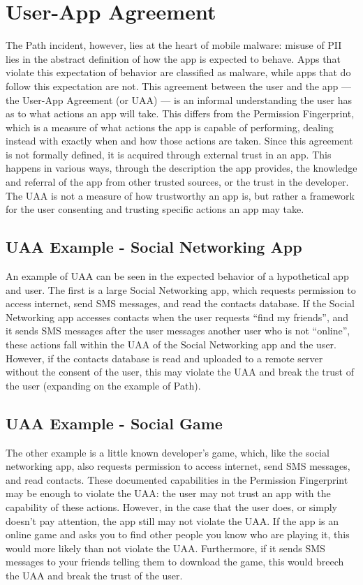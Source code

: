 \section{User-App Agreement}
The Path incident, however, lies at the heart of mobile malware: misuse of PII lies in the abstract definition of how the app is expected to behave. Apps that violate this expectation of behavior are classified as malware, while apps that do follow this expectation are not. This agreement between the user and the app --- the User-App Agreement (or UAA) --- is an informal understanding the user has as to what actions an app will take. This differs from the Permission Fingerprint, which is a measure of what actions the app is capable of performing, dealing instead with exactly when and how those actions are taken. Since this agreement is not formally defined, it is acquired through external trust in an app. This happens in various ways, through the description the app provides, the knowledge and referral of the app from other trusted sources, or the trust in the developer. The UAA is not a measure of how trustworthy an app is, but rather a framework for the user consenting and trusting specific actions an app may take.

\subsection{UAA Example - Social Networking App}
An example of UAA can be seen in the expected behavior of a hypothetical app and user. The first is a large Social Networking app, which requests permission to access internet, send SMS messages, and read the contacts database. If the Social Networking app accesses contacts when the user requests ``find my friends'', and it sends SMS messages after the user messages another user who is not ``online'', these actions fall within the UAA of the Social Networking app and the user. However, if the contacts database is read and uploaded to a remote server without the consent of the user, this may violate the UAA and break the trust of the user (expanding on the example of Path). 

\subsection{UAA Example - Social Game}
The other example is a little known developer's game, which, like the social networking app, also requests permission to access internet, send SMS messages, and read contacts. These documented capabilities in the Permission Fingerprint may be enough to violate the UAA: the user may not trust an app with the capability of these actions. However, in the case that the user does, or simply doesn't pay attention, the app still may not violate the UAA. If the app is an online game and asks you to find other people you know who are playing it, this would more likely than not violate the UAA. Furthermore, if it sends SMS messages to your friends telling them to download the game, this would breech the UAA and break the trust of the user.

